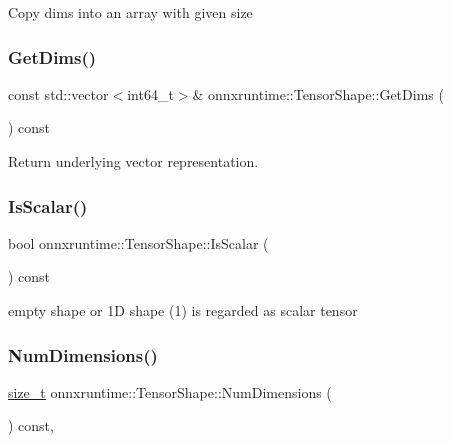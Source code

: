 Copy dims into an array with given size \mbox{\label{classonnxruntime_1_1TensorShape_a37834c200e4b93c78a836db93d9aaa5a}} 
\subsubsection{\texorpdfstring{Get\+Dims()}{GetDims()}}
{\footnotesize\ttfamily const std\+::vector$<$int64\+\_\+t$>$\& onnxruntime\+::\+Tensor\+Shape\+::\+Get\+Dims (\begin{DoxyParamCaption}{ }\end{DoxyParamCaption}) const\hspace{0.3cm}{\ttfamily [inline]}}

Return underlying vector representation. \mbox{\label{classonnxruntime_1_1TensorShape_a5c57c44b3f248614e3066a70e5d1a701}} 
\subsubsection{\texorpdfstring{Is\+Scalar()}{IsScalar()}}
{\footnotesize\ttfamily bool onnxruntime\+::\+Tensor\+Shape\+::\+Is\+Scalar (\begin{DoxyParamCaption}{ }\end{DoxyParamCaption}) const\hspace{0.3cm}{\ttfamily [inline]}}

empty shape or 1D shape (1) is regarded as scalar tensor \mbox{\label{classonnxruntime_1_1TensorShape_af9e40196654d3d161544789f61415c53}} 
\subsubsection{\texorpdfstring{Num\+Dimensions()}{NumDimensions()}}
{\footnotesize\ttfamily \mbox{\hyperlink{mlasi_8h_a503efbc1c6e50825320ad909366b78ab}{size\+\_\+t}} onnxruntime\+::\+Tensor\+Shape\+::\+Num\+Dimensions (\begin{DoxyParamCaption}{ }\end{DoxyParamCaption}) const\hspace{0.3cm}{\ttfamily [inline]}, {\ttfamily [noexcept]}}

